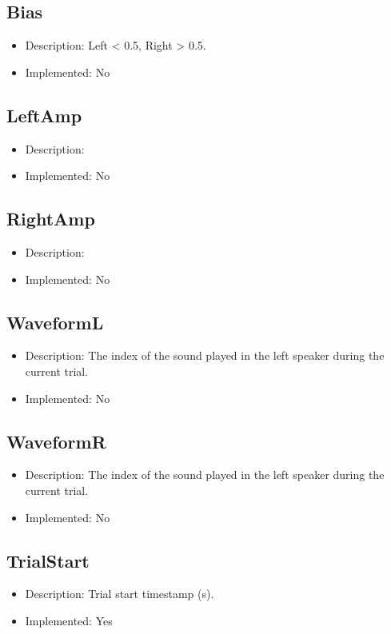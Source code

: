 \subsection*{Bias}
\begin{itemize}
	\item Description: Left < 0.5, Right > 0.5.
	\item Implemented: No
\end{itemize}

\subsection*{LeftAmp}
\begin{itemize}
	\item Description: 
	\item Implemented: No
\end{itemize}

\subsection*{RightAmp}
\begin{itemize}
	\item Description: 
	\item Implemented: No
\end{itemize}

\subsection*{WaveformL}
\begin{itemize}
	\item Description: The index of the sound played in the left speaker during the current trial.
	\item Implemented: No
\end{itemize}

\subsection*{WaveformR}
\begin{itemize}
	\item Description: The index of the sound played in the left speaker during the current trial.
	\item Implemented: No
\end{itemize}

\subsection*{TrialStart}
\begin{itemize}
	\item Description: Trial start timestamp (s).
	\item Implemented: Yes
\end{itemize}


